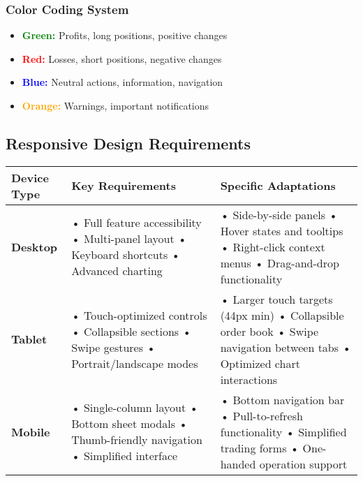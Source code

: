\documentclass{article}
\begin{document}
\subsubsection{Color Coding System}
\begin{itemize}[leftmargin=*]
    \item \textcolor{green}{\textbf{Green:}} Profits, long positions, positive changes
    \item \textcolor{red}{\textbf{Red:}} Losses, short positions, negative changes
    \item \textcolor{blue}{\textbf{Blue:}} Neutral actions, information, navigation
    \item \textcolor{orange}{\textbf{Orange:}} Warnings, important notifications
\end{itemize}

\subsection{Responsive Design Requirements}

\begin{longtable}{|p{}|p{}|p{}|}
\hline
\textbf{Device Type} & \textbf{Key Requirements} & \textbf{Specific Adaptations} \\
\hline
\textbf{Desktop} & 
• Full feature accessibility \newline
• Multi-panel layout \newline
• Keyboard shortcuts \newline
• Advanced charting & 
• Side-by-side panels \newline
• Hover states and tooltips \newline
• Right-click context menus \newline
• Drag-and-drop functionality \\
\hline
\textbf{Tablet} & 
• Touch-optimized controls \newline
• Collapsible sections \newline
• Swipe gestures \newline
• Portrait/landscape modes & 
• Larger touch targets (44px min) \newline
• Collapsible order book \newline
• Swipe navigation between tabs \newline
• Optimized chart interactions \\
\hline
\textbf{Mobile} & 
• Single-column layout \newline
• Bottom sheet modals \newline
• Thumb-friendly navigation \newline
• Simplified interface & 
• Bottom navigation bar \newline
• Pull-to-refresh functionality \newline
• Simplified trading forms \newline
• One-handed operation support \\
\hline
\end{longtable}
\end{document}
